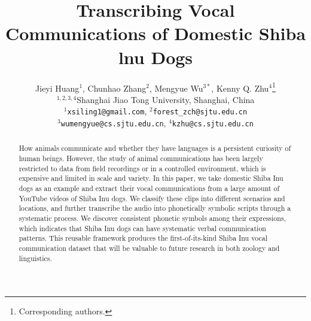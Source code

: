 \documentclass[11pt]{article}
\title{Transcribing Vocal Communications of Domestic Shiba lnu Dogs}
\author{Jieyi Huang$^1$, Chunhao Zhang$^2$, Mengyue Wu$^{3*}$, 
Kenny Q. Zhu$^4$\thanks{\hspace{2mm}Corresponding authors.}\\
	$^{1,2,3,4}$Shanghai Jiao Tong University, Shanghai, China \\
	\texttt{$^1$xsiling1@gmail.com}, 
	\texttt{$^2$forest\_zch@sjtu.edu.cn}\\ 
	\texttt{$^3$wumengyue@cs.sjtu.edu.cn}, 
	\texttt{$^4$kzhu@cs.sjtu.edu.cn}\\}
\newcommand{\MY}[1]{\textcolor{red}{(Mengyue: #1)}}
\begin{document}
\maketitle
\begin{abstract}
How animals communicate and whether they have languages is a persistent
curiosity of human beings. However, the study of animal communications
has been largely restricted to data from field recordings or in a controlled
environment, which is expensive and limited in scale and variety. %
In this paper, we take domestic Shiba Inu dogs as an example and
extract their vocal communications from a large amount of
YouTube videos of Shiba Inu dogs. We classify these clips into different scenarios and locations, and further transcribe
the audio into phonetically symbolic scripts through a systematic
process. We discover consistent phonetic symbols among their expressions, which indicates that Shiba Inu dogs can have systematic verbal communication patterns. This reusable framework produces the first-of-its-kind Shiba Inu
vocal communication dataset that will be valuable to future research
in both zoology and linguistics. 
 
\end{abstract}

\end{document}

